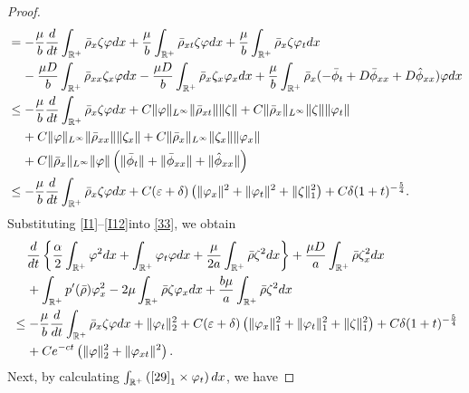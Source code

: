 \documentclass[10pt,a4paper]{amsart}
\begin{document}
\begin{proof}
\begin{align}
			&=-\frac{\mu}{b}	\frac{{\rm d}}{{\rm d}t}\int_{\mathbb{R}^+}\bar\rho_x\zeta \varphi{\rm d}x+\frac{\mu}{b}\int_{\mathbb{R}^+}\bar\rho_{xt}\zeta \varphi{\rm d}x+\frac{\mu}{b}\int_{\mathbb{R}^+}\bar\rho_x\zeta \varphi_t{\rm d}x\notag\\
			&\;\;\;\;-\frac{\mu D}{b}\int_{\mathbb{R}^+}\bar\rho_{xx}\zeta_x\varphi{\rm d}x-\frac{\mu D}{b}\int_{\mathbb{R}^+}\bar\rho_x\zeta_x\varphi_x{\rm d}x+\frac{\mu}{b}\int_{\mathbb{R}^+}\bar\rho_x(-\bar\phi_t+D\bar\phi_{xx}+D\hat\phi_{xx})\varphi{\rm d}x\notag\\
			&\leq -\frac{\mu}{b}	\frac{{\rm d}}{{\rm d}t}\int_{\mathbb{R}^+}\bar\rho_x\zeta \varphi{\rm d}x+C\|\varphi\|_{L^{\infty}}\|\bar\rho_{xt}\|\|\zeta\|+C\|\bar\rho_x\|_{L^{\infty}}\|\zeta\|\|\varphi_t\|\notag\\	
			&\;\;\;\;+C\|\varphi\|_{L^{\infty}}\|\bar\rho_{xx}\|\|\zeta_x\|+C\|\bar\rho_x\|_{L^{\infty}}\|\zeta_x\|\|\varphi_x\|\notag\\
			&\;\;\;\;+C\|\bar\rho_x\|_{L^{\infty}}\|\varphi\|\left(\|\bar\phi_t\|+\|\bar\phi_{xx}\|+\|\hat\phi_{xx}\|\right)\notag\\
			&\leq  -\frac{\mu}{b} 	\frac{{\rm d}}{{\rm d}t} \int_{\mathbb{R}^+}\bar\rho_x\zeta \varphi{\rm d}x+C(\varepsilon+\delta)\left(\|\varphi_x\|^2+\|\varphi_t\|^2+\|\zeta\|_1^2\right) +C\delta(1+t)^{-\frac{5}{4}}.
		\end{align}
		Substituting  \eqref{I1}--\eqref{I12}into \eqref{33}, we obtain
		\begin{align}\label{34}
			&\;\;\;\;	\frac{{\rm d}}{{\rm d}t}\left\{\frac{\alpha}{2}\int_{\mathbb{R}^+}\varphi^2{\rm d}x+\int_{\mathbb{R}^+}\varphi_t\varphi{\rm d}x+\frac{\mu}{2a}\int_{\mathbb{R}^+}\bar\rho\zeta^2{\rm d}x\right\}+\frac{\mu D}{a}\int_{\mathbb{R}^+}\bar\rho\zeta_x^2{\rm d}x\notag\\
			&\;\;\;\;+\int_{\mathbb{R}^+}p^{\prime}(\bar\rho)\varphi_x^2-2\mu\int_{\mathbb{R}^+}\bar\rho\zeta\varphi_x{\rm d}x+\frac{b\mu}{a}\int_{\mathbb{R}^+}\bar\rho\zeta^2{\rm d}x\notag\\
			&\leq -\frac{\mu}{b}	\frac{{\rm d}}{{\rm d}t}\int_{\mathbb{R}^+}\bar\rho_x\zeta \varphi{\rm d}x+\|\varphi_t\|_2^2+C(\varepsilon+\delta)\left(\|\varphi_x\|_1^2+\|\varphi_t\|_1^2+\|\zeta\|_1^2\right)+C\delta(1+t)^{-\frac{5}{4}}\notag\\
			&\;\;\;\;+C{\rm e}^{-ct}\left(\|\varphi\|_2^2+\|\varphi_{xt}\|^2\right).
		\end{align}
		Next, by calculating $\int_{\mathbb{R}^+}\left(\eqref{29}_1\times\varphi_t\right){\rm d}x$, we have

\end{proof}
\end{document}
